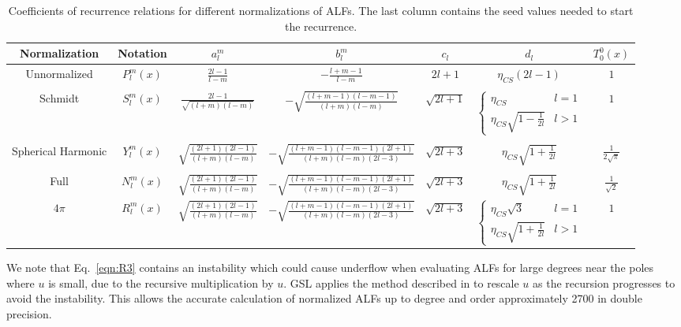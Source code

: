 \documentclass[12pt]{article}
\begin{document}
\begin{table}[ht]
\centering
\scriptsize
\caption{Coefficients of recurrence relations for different normalizations of ALFs. The last column contains the seed values needed to start the recurrence.}
\begin{tabular}{@{}ccccccc@{}}
\toprule
Normalization & Notation & $a_l^m$ & $b_l^m$ & $c_l$ & $d_l$ & $T_0^0(x)$ \\
\midrule
Unnormalized & $P_l^m(x)$ & $\frac{2l-1}{l-m}$ & $-\frac{l+m-1}{l-m}$ & $2l+1$ & $\eta_{CS} \left( 2l-1 \right)$ & $1$ \\
\\
Schmidt & $S_l^m(x)$ & $\frac{2l-1}{\sqrt{(l+m)(l-m)}}$ & $-\sqrt{\frac{(l+m-1)(l-m-1)}{(l+m)(l-m)}}$ & $\sqrt{2l+1}$ & $\left\{ \begin{array}{cc} \eta_{CS} & l = 1 \\ \eta_{CS} \sqrt{1 - \frac{1}{2l}} & l > 1 \end{array} \right.$ & $1$ \\
\\
Spherical Harmonic & $Y_l^m(x)$ & $\sqrt{\frac{(2l+1)(2l-1)}{(l+m)(l-m)}}$ & $-\sqrt{\frac{(l+m-1)(l-m-1)(2l+1)}{(l+m)(l-m)(2l-3)}}$ & $\sqrt{2l+3}$ & $\eta_{CS} \sqrt{1 + \frac{1}{2l}}$ & $\frac{1}{2\sqrt{\pi}}$ \\
\\
Full & $N_l^m(x)$ & $\sqrt{\frac{(2l+1)(2l-1)}{(l+m)(l-m)}}$ & $-\sqrt{\frac{(l+m-1)(l-m-1)(2l+1)}{(l+m)(l-m)(2l-3)}}$ & $\sqrt{2l+3}$ & $\eta_{CS} \sqrt{1 + \frac{1}{2l}}$ & $\frac{1}{\sqrt{2}}$ \\
$4\pi$ & $R_l^m(x)$ & $\sqrt{\frac{(2l+1)(2l-1)}{(l+m)(l-m)}}$ & $-\sqrt{\frac{(l+m-1)(l-m-1)(2l+1)}{(l+m)(l-m)(2l-3)}}$ & $\sqrt{2l+3}$ & $\left\{ \begin{array}{cc} \eta_{CS} \sqrt{3} & l = 1 \\ \eta_{CS} \sqrt{1 + \frac{1}{2l}} & l > 1 \end{array} \right.$ & $1$ \\
\bottomrule
\end{tabular}
\label{tab:recurrence}
\end{table}

We note that Eq.~\eqref{eqn:R3} contains an instability which
could cause underflow when evaluating ALFs for large degrees
near the poles where $u$ is small, due to the recursive multiplication
by $u$. GSL applies the method described in \citet{holmes2002}
to rescale $u$ as the recursion progresses to avoid the instability.
This allows the accurate calculation of normalized ALFs up to degree
and order approximately 2700 in double precision.
\end{document}
